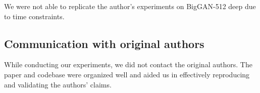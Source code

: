 We were not able to replicate the author's experiments on BigGAN-512 deep due to time constraints. 

\subsection{Communication with original authors}

While conducting our experiments, we did not contact the original authors. The paper and codebase were organized well and aided us in effectively reproducing and validating the authors' claims.
